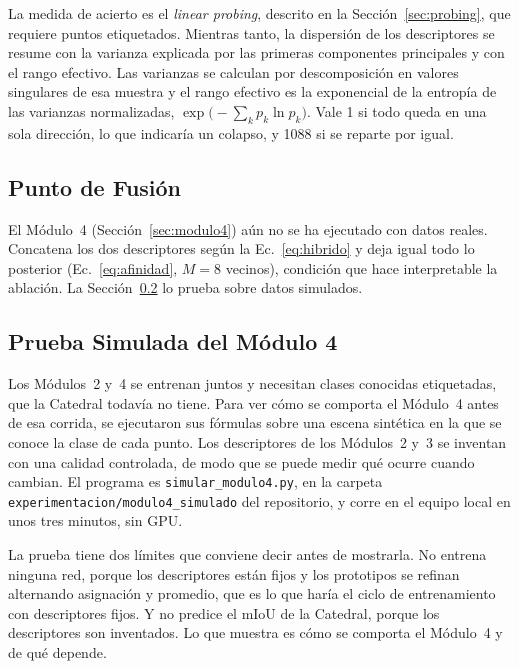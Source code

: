 La medida de acierto es el \emph{linear probing}, descrito en la
Sección~\ref{sec:probing}, que requiere puntos etiquetados. Mientras tanto, la
dispersión de los descriptores se resume con la varianza explicada por las
primeras componentes principales y con el rango efectivo. Las varianzas se
calculan por descomposición en valores singulares de esa muestra y el rango
efectivo es la exponencial de la entropía de las varianzas normalizadas,
$\exp\!\big(-\sum_k p_k\ln p_k\big)$. Vale 1 si todo queda en una sola
dirección, lo que indicaría un colapso, y 1088 si se reparte por igual.



\FloatBarrier
\subsection{Punto de Fusión}
\label{sec:fusion}

El Módulo~4 (Sección~\ref{sec:modulo4}) aún no se ha ejecutado con datos reales.
Concatena los dos descriptores según la Ec.~\eqref{eq:hibrido} y deja igual todo
lo posterior (Ec.~\eqref{eq:afinidad}, $M=8$ vecinos), condición que hace
interpretable la ablación. La Sección~\ref{sec:m4-simulado} lo prueba sobre datos
simulados.

\FloatBarrier
\subsection{Prueba Simulada del Módulo 4}
\label{sec:m4-simulado}

Los Módulos~2 y~4 se entrenan juntos y necesitan clases conocidas etiquetadas,
que la Catedral todavía no tiene. Para ver cómo se comporta el Módulo~4 antes de
esa corrida, se ejecutaron sus fórmulas sobre una escena sintética en la que se
conoce la clase de cada punto. Los descriptores de los Módulos~2 y~3 se inventan
con una calidad controlada, de modo que se puede medir qué ocurre cuando cambian.
El programa es \texttt{simular\_modulo4.py}, en la carpeta
\texttt{experimentacion/modulo4\_simulado} del repositorio, y corre en el equipo
local en unos tres minutos, sin GPU.

La prueba tiene dos límites que conviene decir antes de mostrarla. No entrena
ninguna red, porque los descriptores están fijos y los prototipos se refinan
alternando asignación y promedio, que es lo que haría el ciclo de entrenamiento
con descriptores fijos. Y no predice el mIoU de la Catedral, porque los
descriptores son inventados. Lo que muestra es cómo se comporta el Módulo~4 y de
qué depende.

